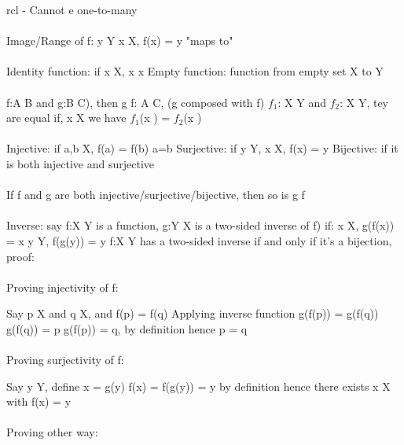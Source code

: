 \documentclass{article}
\begin{document}
\begin{arrary}{rcl}
- Cannot e one-to-many
\\
\\
Image/Range of f: {y \in Y \vert \exists x \in X, f(x) = y}
\newline \mapsto  "maps to"
\\
\\
Identity function: if x \in X, x \mapsto  x
\newline Empty function: function from empty set X to Y
\\
\\
\math f:A \rightarrow B and g:B \rightarrow C\)), then \math g \circ f: A \rightarrow C\), (g composed with f)
\newline \math $f_1$: X \rightarrow Y\) and \math $f_2$: X \rightarrow Y\), tey are equal if, \forall x \in X\) we have \math $f_1$(x ) = $f_2$(x )\)
\\
\\
Injective: if \forall a,b \in X, f(a) = f(b) \Rightarrow a=b
\newline Surjective: if \forall y \in Y, \exists x \in X, f(x) = y
\newline Bijective: if it is both injective and surjective
\\
\\
If f and g are both injective/surjective/bijective, then so is g \circ f
\\
\\
Inverse: say \math f:X \rightarrow Y\) is a function, \math g:Y \rightarrow X\) is a two-sided inverse of \math f\)) if:
\newline \forall x \in X, g(f(x)) = x
\newline \forall y \in Y, f(g(y)) = y
\newline \math f:X \rightarrow Y\) has a two-sided inverse if and only if it's a bijection, proof:
\\
\\
Proving injectivity of f:

Say p \in X and q \in X, and f(p) = f(q)
\newline Applying inverse function g(f(p)) = g(f(q))
\newline g(f(q)) = p
\newline g(f(p)) = q, by definition
\newline hence p = q
\\
\\
Proving surjectivity of f:

Say y \in Y, define x = g(y)
\newline f(x) = f(g(y)) = y by definition
\newline hence there exists x \in X with f(x) = y
\\
\\
Proving other way:


\end{arrary}
\end{document}
